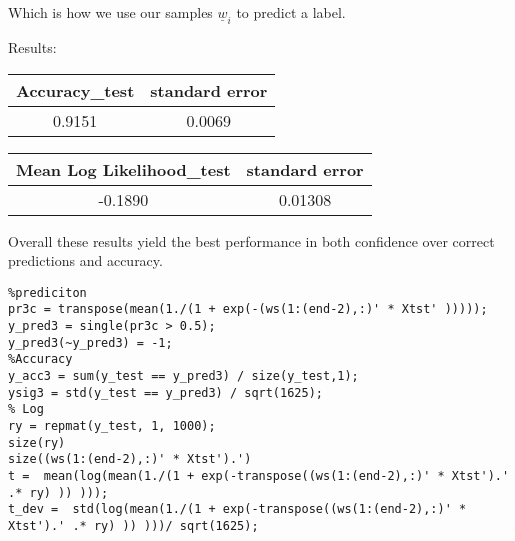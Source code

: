 \documentclass[11pt]{article}
\begin{document}
Which is how we use our samples $\underline{w}_{i}$ to predict a label.

Results:
\begin{center}
\begin{tabular}{|c|c|}
\hline
Accuracy\_test & standard error \\
 \hline
0.9151 &0.0069 \\
\hline
\end{tabular}
\begin{tabular}{|c|c|}
\hline
Mean Log Likelihood\_test & standard error \\
 \hline
-0.1890& 0.01308 \\
\hline
\end{tabular}
\end{center}
Overall these results yield the best performance in both confidence over correct predictions and accuracy.

\begin{lstlisting}
%prediciton
pr3c = transpose(mean(1./(1 + exp(-(ws(1:(end-2),:)' * Xtst' )))));
y_pred3 = single(pr3c > 0.5);
y_pred3(~y_pred3) = -1;
%Accuracy
y_acc3 = sum(y_test == y_pred3) / size(y_test,1);
ysig3 = std(y_test == y_pred3) / sqrt(1625);
% Log 
ry = repmat(y_test, 1, 1000);
size(ry)
size((ws(1:(end-2),:)' * Xtst').')
t =  mean(log(mean(1./(1 + exp(-transpose((ws(1:(end-2),:)' * Xtst').' .* ry) )) )));
t_dev =  std(log(mean(1./(1 + exp(-transpose((ws(1:(end-2),:)' * Xtst').' .* ry) )) )))/ sqrt(1625);
\end{lstlisting}
\end{document}
